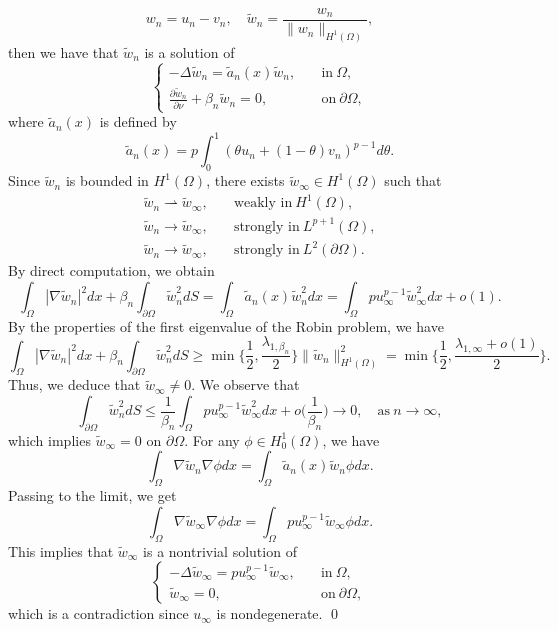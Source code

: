 \documentclass[12pt,reqno]{amsart}
\numberwithin{equation}{section}
\theoremstyle{definition}
\begin{document}
$$
w_n=u_n-v_n,\quad \tilde{w}_n=\frac{w_n}{\|w_n\|_{H^1(\Omega)}},
$$
then we have that $\tilde{w}_n$ is a solution of 
\begin{equation*}
\begin{cases}
-\Delta \tilde{w}_n=\tilde{a}_n(x)\tilde{w}_n,\quad &\text{in}\  \Omega,\\
\frac{\partial \tilde{w}_n}{\partial \nu}+\beta_n \tilde{w}_n=0, &\text{on}\ \partial\Omega,
\end{cases}
\end{equation*}
where $\tilde{a}_n(x)$ is defined by 
$$
\tilde{a}_n(x)=p\int_0^1(\theta u_n+(1-\theta)v_n)^{p-1}d\theta.
$$
Since $\tilde{w}_n$ is bounded in $H^1(\Omega)$, there exists $\tilde{w}_\infty\in H^1(\Omega)$ such that 
\begin{align*}
\tilde{w}_n\rightharpoonup \tilde{w}_\infty,\quad &\text{weakly in}\ H^1(\Omega),\\
\tilde{w}_n\to \tilde{w}_\infty,\quad &\text{strongly in}\ L^{p+1}(\Omega),\\
\tilde{w}_n\to \tilde{w}_\infty,\quad &\text{strongly in}\ L^{2}(\partial\Omega).
\end{align*}
By direct computation, we obtain 
$$
\int_{\Omega}|\nabla \tilde{w}_n|^2dx+\beta_n\int_{\partial\Omega}\tilde{w}_n^2dS=\int_{\Omega}\tilde{a}_n(x)\tilde{w}_n^2dx=\int_{\Omega}pu_\infty^{p-1}\tilde{w}_\infty^2dx+o(1).
$$
By the properties of the first eigenvalue of the Robin problem, we have 
$$
\int_{\Omega}|\nabla \tilde{w}_n|^2dx+\beta_n\int_{\partial\Omega}\tilde{w}_n^2dS\ge \min\Big\{\frac{1}{2},\frac{\lambda_{1,\beta_n}}{2}\Big\}\|\tilde{w}_n\|_{H^1(\Omega)}^2=\min\Big\{\frac{1}{2},\frac{\lambda_{1,\infty}+o(1)}{2}\Big\}.
$$
Thus, we deduce that $\tilde{w}_\infty\neq 0$. We observe that 
$$
\int_{\partial\Omega}\tilde{w}_n^2dS\le\frac{1}{\beta_n}\int_{\Omega}pu_\infty^{p-1}\tilde{w}_\infty^2dx+o\Big(\frac{1}{\beta_n}\Big)\to 0,\quad \text{as}\ n\to\infty,
$$
which implies $\tilde{w}_\infty=0$ on $\partial \Omega$. For any $\phi\in H_0^1(\Omega)$, we have 
$$
\int_{\Omega}\nabla \tilde{w}_n\nabla\phi dx=\int_{\Omega}\tilde{a}_n(x)\tilde{w}_n\phi dx.
$$
Passing to the limit, we get 
$$
\int_{\Omega}\nabla \tilde{w}_\infty\nabla\phi dx=\int_{\Omega}pu_\infty^{p-1}\tilde{w}_\infty\phi dx.
$$
This implies that $\tilde{w}_\infty$ is a nontrivial solution of 
\begin{equation*}
\begin{cases}
-\Delta \tilde{w}_\infty=pu_\infty^{p-1}\tilde{w}_\infty,\quad &\text{in}\ \Omega,\\
\tilde{w}_\infty=0, &\text{on}\ \partial\Omega,
\end{cases}
\end{equation*}
which is a contradiction since $u_\infty$ is nondegenerate.
\qed
\end{document}
